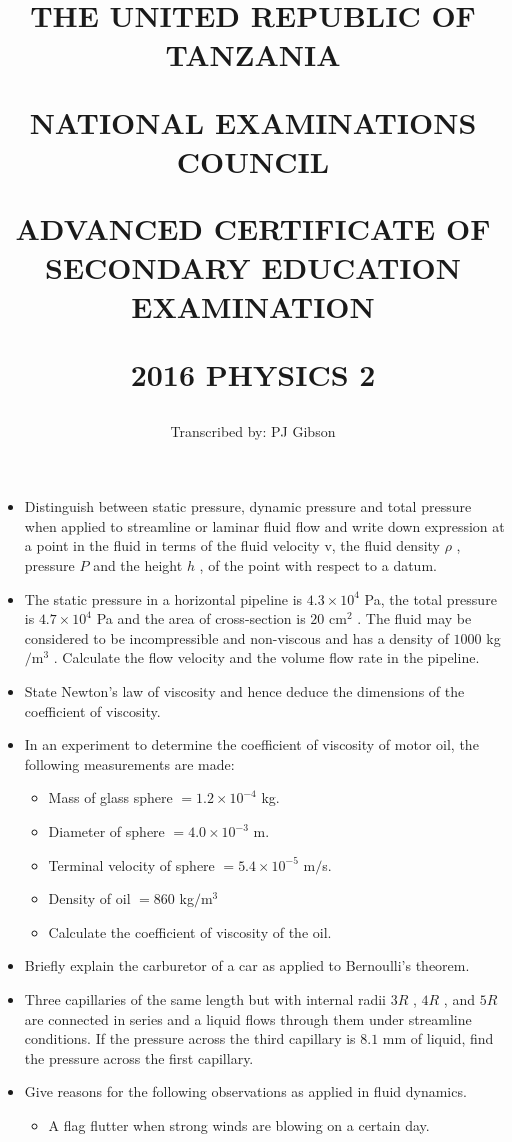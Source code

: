 \documentclass{article}
\title{THE UNITED REPUBLIC OF TANZANIA

NATIONAL EXAMINATIONS COUNCIL

ADVANCED CERTIFICATE OF SECONDARY EDUCATION EXAMINATION

\textbf{2016 PHYSICS 2}}
\author{Transcribed by:  PJ Gibson}
\begin{document}
\maketitle

\begin{itemize}
\item Distinguish between static pressure, dynamic pressure and total pressure when applied to streamline or laminar fluid flow and write down expression at a point in the fluid in terms of the fluid velocity v, the fluid density $ \rho $ , pressure $ P$ and the height $ h$ , of the point with respect to a datum.  
\item The static pressure in a horizontal pipeline is $ 4.3 \times 10^{4}$ Pa, the total pressure is $ 4.7 \times 10^{4}$ Pa and the area of cross-section is $ 20 $ cm$ ^{2}$ . The fluid may be considered to be incompressible and non-viscous and has a density of $ 1000$ kg$/$m$ ^{3}$ .  Calculate the flow velocity and the volume flow rate in the pipeline.
\item State Newton’s law of viscosity and hence deduce the dimensions of the coefficient of viscosity.
\item In an experiment to determine the coefficient of viscosity of motor oil, the following measurements are made:
 \begin{itemize}
\item Mass of glass sphere $ =1.2 \times 10^{-4}$ kg.
\item Diameter of sphere $ =4.0 \times 10^{-3}$ m.
\item Terminal velocity of sphere $ =5.4 \times 10^{-5}$ m$/$s.
\item Density of oil $ =860$ kg$/$m$ ^{3}$
\item Calculate the coefficient of viscosity of the oil.
\end{itemize}
\item Briefly explain the carburetor of a car as applied to Bernoulli’s theorem.
\item Three capillaries of the same length but with internal radii $ 3R$ , $ 4R$ , and $ 5R$ are connected in series and a liquid flows through them under streamline conditions.  If the pressure across the third capillary is $ 8.1$ mm of liquid, find the pressure across the first capillary.
\item Give reasons for the following observations as applied in fluid dynamics.
 \begin{itemize}
\item A flag flutter when strong winds are blowing on a certain day.

\end{itemize}
\end{itemize}
\end{document}
